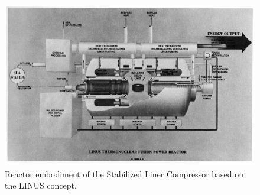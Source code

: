 \begin{figure}[h!] 
\begin{center} 
\includegraphics[scale=0.5]{SubreportFigures//LINUS_reactor.pdf} 
\end{center} 
\caption{Reactor embodiment of the Stabilized Liner Compressor based on the LINUS concept.} 
\label{fig::INUS} 
\end{figure} 